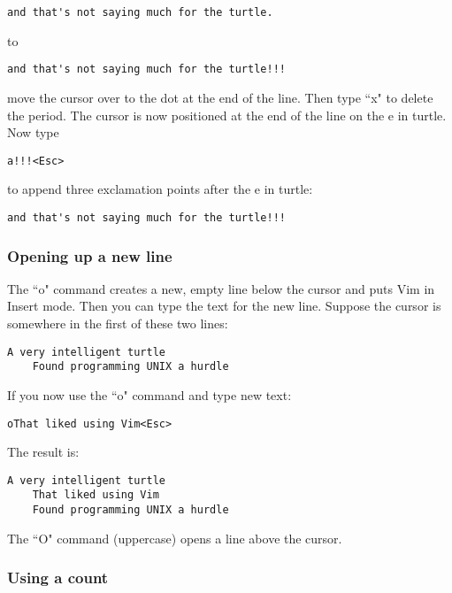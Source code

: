 		\begin{Verbatim}[samepage=true]
    and that's not saying much for the turtle. 
		\end{Verbatim}
to
		\begin{Verbatim}[samepage=true]
    and that's not saying much for the turtle!!! 
		\end{Verbatim}

move the cursor over to the dot at the end of the line. Then type ``x" to delete the period.
The cursor is now positioned at the end of the line on the e in turtle.
Now type 

	\begin{Verbatim}[samepage=true]
	a!!!<Esc>
	\end{Verbatim}

to append three exclamation points after the e in turtle:

	\begin{Verbatim}[samepage=true]
	and that's not saying much for the turtle!!! 
	\end{Verbatim}

\subsubsection{Opening up a new line}

The ``o" command creates a new, empty line below the cursor and puts Vim in Insert mode.
Then you can type the text for the new line.
Suppose the cursor is somewhere in the first of these two lines: 

		\begin{Verbatim}[samepage=true]
    A very intelligent turtle 
    Found programming UNIX a hurdle 
		\end{Verbatim}

If you now use the ``o" command and type new text:

		\begin{Verbatim}[samepage=true]
		oThat liked using Vim<Esc>
		\end{Verbatim}

The result is:

		\begin{Verbatim}[samepage=true]
    A very intelligent turtle 
    That liked using Vim 
    Found programming UNIX a hurdle 
		\end{Verbatim}

The ``O" command (uppercase) opens a line above the cursor.

\subsubsection{Using a count}


